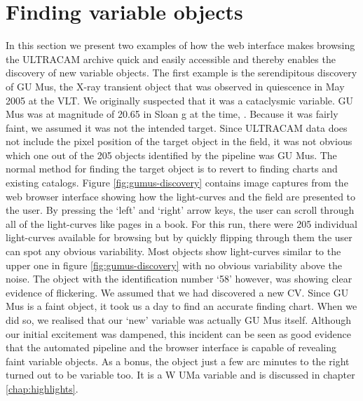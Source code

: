 \section{Finding variable objects}
In this section we present two examples of how the web interface makes browsing the ULTRACAM archive quick and easily accessible and thereby enables the discovery of new variable objects. The first example is the serendipitous discovery of {GU Mus}, the X-ray transient object that was observed in quiescence in May 2005 at the VLT. We originally suspected that it was a cataclysmic variable. {GU Mus} was at magnitude of 20.65 in Sloan g at the time, \citep{tariq2010}. Because it was fairly faint, we assumed it was not the intended target. Since ULTRACAM data does not include the pixel position of the target object in the field, it was not obvious which one out of the 205 objects identified by the pipeline was {GU Mus}. The normal method for finding the target object is to revert to finding charts and existing catalogs. Figure \ref{fig:gumus-discovery} contains image captures from the web browser interface showing how the light-curves and the field are presented to the user. By pressing the `left' and `right' arrow keys, the user can scroll through all of the light-curves like pages in a book. For this run, there were 205 individual light-curves available for browsing but by quickly flipping through them the user can spot any obvious variability. Most objects show light-curves similar to the upper one in figure \ref{fig:gumus-discovery} with no obvious variability above the noise. The object with the identification number `58' however, was showing clear evidence of flickering. We assumed that we had discovered a new CV. Since {GU Mus} is a faint object, it took us a day to find an accurate finding chart. When we did so, we realised that our `new' variable was actually {GU Mus} itself. Although our initial excitement was dampened, this incident can be seen as good evidence that the automated pipeline and the browser interface is capable of revealing faint variable objects. As a bonus, the object just a few arc minutes to the right turned out to be variable too. It is a {W UMa} variable and is discussed in chapter \ref{chap:highlights}.

